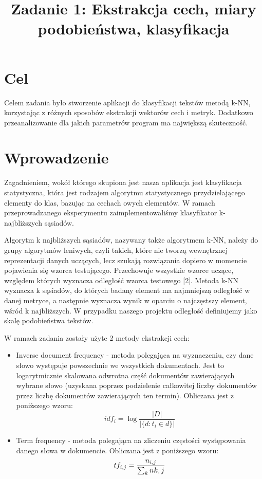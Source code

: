 \documentclass{classrep}
\author{
  \studentinfo{Piotr Traczyk}{123123} \and
  \studentinfo{Bartosz Jurczewski}{210209}
}
\title{Zadanie 1: Ekstrakcja cech, miary podobieństwa, klasyfikacja}
\begin{document}
\maketitle


\section{Cel}
Celem zadania było stworzenie aplikacji do klasyfikacji tekstów metodą k-NN, korzystając z różnych sposobów ekstrakcji wektorów cech i metryk.
Dodatkowo przeanalizowanie dla jakich parametrów program ma największą skuteczność.

\section{Wprowadzenie}
Zagadnieniem, wokół którego skupiona jest nasza aplikacja jest klasyfikacja statystyczna, która jest rodzajem algorytmu statystycznego przydzielającego elementy do klas, bazując na cechach owych elementów. W ramach przeprowadzanego eksperymentu zaimplementowaliśmy klasyfikator k-najbliższych sąsiadów. \newline

Algorytm k najbliższych sąsiadów, nazywany także algorytmem k-NN, należy do grupy algorytmów leniwych, czyli takich, które nie tworzą wewnętrznej reprezentacji danych uczących, lecz szukają rozwiązania dopiero w momencie pojawienia się wzorca testującego. Przechowuje wszystkie wzorce uczące, względem których wyznacza odległość wzorca testowego [2]. Metoda k-NN wyznacza k sąsiadów, do których badany element ma najmniejszą odległość w danej metryce, a następnie wyznacza wynik w oparciu o najczęstszy element, wśród k najbliższych. W przypadku naszego projektu odległość definiujemy jako skalę podobieństwa tekstów. \newline

W ramach zadania zostały użyte 2 metody ekstrakcji cech: \newline
\begin{itemize}[label=$\circ$]

\item Inverse document frequency - metoda polegająca na wyznaczeniu, czy dane słowo występuje powszechnie we wszystkich dokumentach. Jest to logarytmicznie skalowana odwrotna część dokumentów zawierających wybrane słowo (uzyskana poprzez podzielenie całkowitej liczby dokumentów przez liczbę dokumentów zawierających ten termin). Obliczana jest z poniższego wzoru:
$$
idf_{i}
= \log\frac{|D|}{|\{d : t_{i} \in d\}|}
$$

\item Term frequency - metoda polegająca na zliczeniu częstości występowania danego słowa w dokumencie. Obliczana jest z poniższego wzoru:
$$
tf_{i,j}
= \frac{n_{i,j}}{\sum_{k}n{k,j}}\\[2\baselineskip]
$$
\end{itemize}
\end{document}
